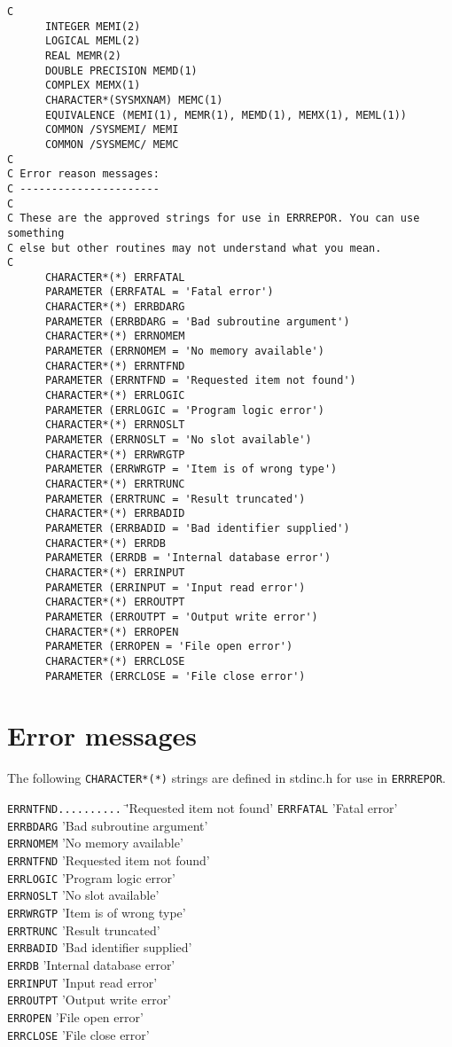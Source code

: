 \begin{verbatim}
C
      INTEGER MEMI(2)
      LOGICAL MEML(2)
      REAL MEMR(2)
      DOUBLE PRECISION MEMD(1)
      COMPLEX MEMX(1)
      CHARACTER*(SYSMXNAM) MEMC(1)
      EQUIVALENCE (MEMI(1), MEMR(1), MEMD(1), MEMX(1), MEML(1))
      COMMON /SYSMEMI/ MEMI
      COMMON /SYSMEMC/ MEMC
C
C Error reason messages:
C ----------------------
C
C These are the approved strings for use in ERRREPOR. You can use something
C else but other routines may not understand what you mean.
C
      CHARACTER*(*) ERRFATAL
      PARAMETER (ERRFATAL = 'Fatal error')
      CHARACTER*(*) ERRBDARG
      PARAMETER (ERRBDARG = 'Bad subroutine argument')
      CHARACTER*(*) ERRNOMEM
      PARAMETER (ERRNOMEM = 'No memory available')
      CHARACTER*(*) ERRNTFND
      PARAMETER (ERRNTFND = 'Requested item not found')
      CHARACTER*(*) ERRLOGIC
      PARAMETER (ERRLOGIC = 'Program logic error')
      CHARACTER*(*) ERRNOSLT
      PARAMETER (ERRNOSLT = 'No slot available')
      CHARACTER*(*) ERRWRGTP
      PARAMETER (ERRWRGTP = 'Item is of wrong type')
      CHARACTER*(*) ERRTRUNC
      PARAMETER (ERRTRUNC = 'Result truncated')
      CHARACTER*(*) ERRBADID
      PARAMETER (ERRBADID = 'Bad identifier supplied')
      CHARACTER*(*) ERRDB
      PARAMETER (ERRDB = 'Internal database error')
      CHARACTER*(*) ERRINPUT
      PARAMETER (ERRINPUT = 'Input read error')
      CHARACTER*(*) ERROUTPT
      PARAMETER (ERROUTPT = 'Output write error')
      CHARACTER*(*) ERROPEN
      PARAMETER (ERROPEN = 'File open error')
      CHARACTER*(*) ERRCLOSE
      PARAMETER (ERRCLOSE = 'File close error')
\end{verbatim} 

\newpage
\section{Error messages}

The following {\tt CHARACTER*(*)} strings are defined in stdinc.h for
use in {\tt ERRREPOR}.
\begin{tabbing}
{\tt ERRNTFND..........} \= 'Requested item not found'\kill
{\tt ERRFATAL} \> 'Fatal error'\\
{\tt ERRBDARG} \> 'Bad subroutine argument'\\
{\tt ERRNOMEM} \> 'No memory available'\\
{\tt ERRNTFND} \> 'Requested item not found'\\
{\tt ERRLOGIC} \> 'Program logic error'\\
{\tt ERRNOSLT} \> 'No slot available'\\
{\tt ERRWRGTP} \> 'Item is of wrong type'\\
{\tt ERRTRUNC} \> 'Result truncated'\\
{\tt ERRBADID} \> 'Bad identifier supplied'\\
{\tt ERRDB} \> 'Internal database error'\\
{\tt ERRINPUT} \> 'Input read error'\\
{\tt ERROUTPT} \> 'Output write error'\\
{\tt ERROPEN} \> 'File open error'\\
{\tt ERRCLOSE} \> 'File close error'
\end{tabbing}
\newpage
